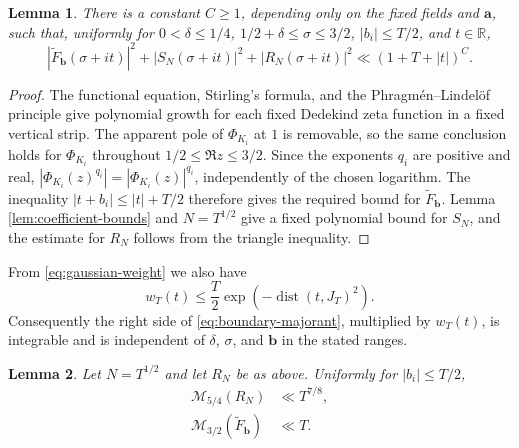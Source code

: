 \documentclass[11pt]{amsart}
\numberwithin{equation}{section}
\theoremstyle{plain}
\newtheorem{lem}{Lemma}[section]
\newcommand{\R}{\mathbb{R}}
\renewcommand{\tilde}{\widetilde}
\renewcommand{\le}{\leqslant}
\renewcommand{\ge}{\geqslant}
\begin{document}
\begin{lem}\label{lem:strip-growth}
There is a constant
$C\ge1$, depending only on the fixed fields and $\mathbf a$, such that,
uniformly for $0<\delta\le1/4$, $1/2+\delta\le\sigma\le3/2$,
$|b_i|\le T/2$, and $t\in\R$,
\begin{equation}\label{eq:boundary-majorant}
|\tilde F_{\mathbf b}(\sigma+it)|^2
+|S_N(\sigma+it)|^2
+|R_N(\sigma+it)|^2
\ll (1+T+|t|)^C.
\end{equation}
\end{lem}

\begin{proof}
The functional equation, Stirling's formula, and the
Phragm\'en--Lindel\"of principle give polynomial growth for each fixed
Dedekind zeta function in a fixed vertical strip.  The apparent pole of
$\Phi_{K_i}$ at $1$ is removable, so the same conclusion holds for
$\Phi_{K_i}$ throughout $1/2\le\Re z\le3/2$.  Since the exponents $q_i$
are positive and real,
$|\Phi_{K_i}(z)^{q_i}|=|\Phi_{K_i}(z)|^{q_i}$, independently of the
chosen logarithm.  The inequality $|t+b_i|\le |t|+T/2$ therefore gives
the required bound for $\tilde F_{\mathbf b}$.  Lemma
\ref{lem:coefficient-bounds} and $N=T^{1/2}$ give a fixed polynomial bound
for $S_N$, and the estimate for $R_N$ follows from the triangle
inequality.
\end{proof}

From \eqref{eq:gaussian-weight} we also have
\begin{equation}\label{eq:gaussian-majorant}
w_T(t)\le \frac{T}{2}
\exp\left(-\operatorname{dist}(t,J_T)^2\right).
\end{equation}
Consequently the right side of \eqref{eq:boundary-majorant}, multiplied by
$w_T(t)$, is integrable and is independent of $\delta$, $\sigma$, and
$\mathbf b$ in the stated ranges.

\begin{lem}\label{lem:right-error}
Let $N=T^{1/2}$ and let $R_N$ be as above.
Uniformly for $|b_i|\le T/2$,
\begin{align}
\mathcal M_{5/4}(R_N)&\ll T^{7/8},                    \label{eq:right-error}\\
\mathcal M_{3/2}(\tilde F_{\mathbf b})&\ll T.     \label{eq:right-F}
\end{align}
\end{lem}
\end{document}
